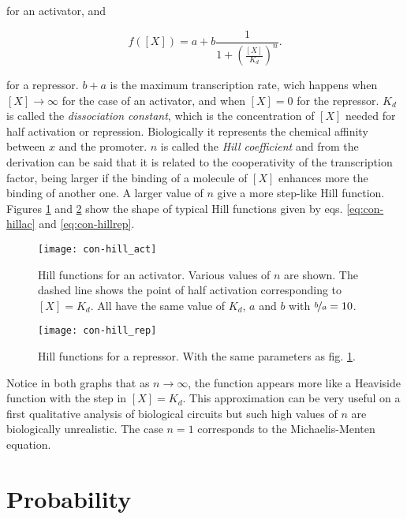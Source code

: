 for an activator, and

\begin{equation}
  \label{eq:con-hillrep}
  f([X]) = a + b \frac{1}{1+\left(\frac{[X]}{K_d}\right)^n}.
\end{equation}

for a repressor. $b+a$ is the maximum transcription rate, wich happens when $[X]\rightarrow\infty$ for the case of an activator, and when $[X]=0$ for the repressor. $K_d$ is called the \textit{dissociation constant}, which is the concentration of $[X]$ needed for half activation or repression. Biologically it represents the chemical affinity between $x$ and the promoter.  $n$ is called the \textit{Hill coefficient} and from the derivation can be said that it is related to the cooperativity of the transcription factor, being larger if the binding of a molecule of $[X]$ enhances more the binding of another one. A larger value of $n$ give a more step-like Hill function. Figures \ref{fig:con-hill_act} and \ref{fig:con-hill_rep} show the shape of typical Hill functions given by eqs. \eqref{eq:con-hillac} and \eqref{eq:con-hillrep}.

\begin{figure}[H]
  \centering
  \texttt{[image: con-hill\_act]}
  \caption[Hill function for an activator]{\label{fig:con-hill_act} Hill functions for an activator. Various values of $n$ are shown. The dashed line shows the point of half activation corresponding to $[X]=K_d$. All have the same value of $K_d$, $a$ and $b$ with $\nicefrac{b}{a}=10$.}
\end{figure}

\begin{figure}[H]
  \centering
  \texttt{[image: con-hill\_rep]}
  \caption[Hill function for a repressor]{\label{fig:con-hill_rep} Hill functions for a repressor. With the same parameters as fig. \ref{fig:con-hill_act}.}
\end{figure}

Notice in both graphs that as $n\rightarrow\infty$, the function appears more like a Heaviside function with the step in $[X] = K_d$. This approximation can be very useful on a first qualitative analysis of biological circuits but such high values of $n$ are biologically unrealistic. The case $n=1$ corresponds to the Michaelis-Menten equation.

\section{Probability}

